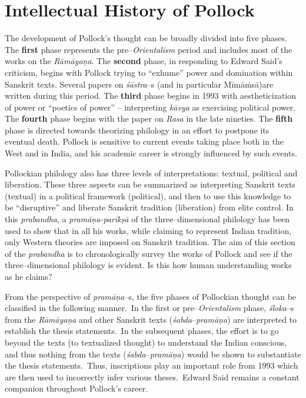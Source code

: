 
\chapter{Intellectual History of Pollock}\label{Anubandha1}

The development of Pollock’s thought can be broadly divided into five phases. The \textbf{first} phase represents the pre–\textit{Orientalism} period and includes most of the works on the \textit{Rāmāyaṇa}. The \textbf{second }phase, in responding to Edward Said’s criticism, begins with Pollock trying to “exhume” power and domination within Sanskrit texts. Several papers on \textit{śāstra}–s (and in particular Mīmāṁsā)are written during this period. The \textbf{third} phase begins in 1993 with aestheticization of power or “poetics of power” – interpreting \textit{kāvya} as exercising political power. The \textbf{fourth} phase begins with the paper on \textit{Rasa} in the late nineties. The \textbf{fifth} phase is directed towards theorizing philology in an effort to postpone its eventual death. Pollock is sensitive to current events taking place both in the West and in India, and his academic career is strongly influenced by such events.

Pollockian philology also has three levels of interpretations: textual, political and liberation. These three aspects can be summarized as interpreting Sanskrit texts (textual) in a political framework (political), and then to use this knowledge to be “disruptive” and liberate Sanskrit tradition (liberation) from elite control. In this \textit{prabandha}, a \textit{pramāṇa-parīkṣā} of the three–dimensional philology has been used to show that in all his works, while claiming to represent Indian tradition, only Western theories are imposed on Sanskrit tradition. The aim of this section of the \textit{prabandha} is to chronologically survey the works of Pollock and see if the three–dimensional philology is evident. Is this how human understanding works as he claims?

\newpage

From the perspective of \textit{pramāṇa–}s, the five phases of Pollockian thought can be classified in the following manner.~In the first or pre–\textit{Orientalism} phase, \textit{śloka}–s from the \textit{Rāmāyaṇa} and other Sanskrit texts (\textit{śabda}–\textit{pramāṇa}) are interpreted to establish the thesis statements.~In the subsequent phases, the effort is to go beyond the texts (to textualized thought) to understand the Indian conscious, and thus nothing from the texts (\textit{śabda}–\textit{pramāṇa}) would be shown to substantiate the thesis statements.~Thus, inscriptions play an important role from 1993 which are then used to incorrectly infer various theses.~Edward Said remains a constant companion throughout Pollock’s career.

